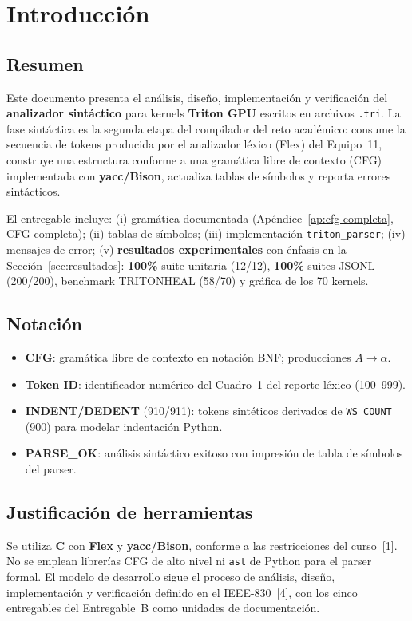 \section{Introducción}

\subsection{Resumen}
Este documento presenta el análisis, diseño, implementación y verificación del \textbf{analizador sintáctico} para kernels \textbf{Triton GPU} escritos en archivos \texttt{.tri}. La fase sintáctica es la segunda etapa del compilador del reto académico: consume la secuencia de tokens producida por el analizador léxico (Flex) del Equipo~11, construye una estructura conforme a una gramática libre de contexto (CFG) implementada con \textbf{yacc/Bison}, actualiza tablas de símbolos y reporta errores sintácticos.

El entregable incluye: (i) gramática documentada (Apéndice~\ref{ap:cfg-completa}, CFG completa); (ii) tablas de símbolos; (iii) implementación \texttt{triton\_parser}; (iv) mensajes de error; (v) \textbf{resultados experimentales} con énfasis en la Sección~\ref{sec:resultados}: \textbf{100\%} suite unitaria (12/12), \textbf{100\%} suites JSONL (200/200), benchmark TRITONHEAL (58/70) y gráfica de los 70 kernels.

\subsection{Notación}
\begin{itemize}
  \item \textbf{CFG}: gramática libre de contexto en notación BNF; producciones $A \rightarrow \alpha$.
  \item \textbf{Token ID}: identificador numérico del Cuadro~1 del reporte léxico (100--999).
  \item \textbf{INDENT/DEDENT} (910/911): tokens sintéticos derivados de \texttt{WS\_COUNT} (900) para modelar indentación Python.
  \item \textbf{PARSE\_OK}: análisis sintáctico exitoso con impresión de tabla de símbolos del parser.
\end{itemize}

\subsection{Justificación de herramientas}
Se utiliza \textbf{C} con \textbf{Flex} y \textbf{yacc/Bison}, conforme a las restricciones del curso~[1]. No se emplean librerías CFG de alto nivel ni \texttt{ast} de Python para el parser formal. El modelo de desarrollo sigue el proceso de análisis, diseño, implementación y verificación definido en el IEEE-830~[4], con los cinco entregables del Entregable~B como unidades de documentación.

